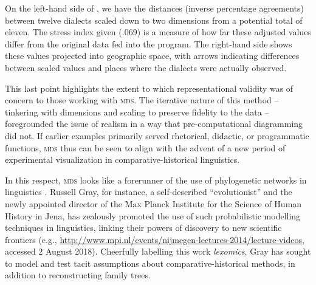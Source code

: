 \documentclass[output=paper]{langscibook}
\begin{document}
On the left-hand side of , we have the distances (inverse percentage agreements) between twelve dialects scaled down to two dimensions from a potential total of eleven. The stress index given (.069) is a measure of how far these adjusted values differ from the original data fed into the program. The right-hand side shows these values projected into geographic space, with arrows indicating differences between scaled values and places where the dialects were actually observed.

This last point highlights the extent to which representational validity was of concern to those working with \textsc{mds}. The iterative nature of this method -- tinkering with dimensions and scaling to preserve fidelity to the data -- foregrounded the issue of realism in a way that pre-computational diagramming did not. If earlier examples primarily served rhetorical, didactic, or programmatic functions, \textsc{mds} thus can be seen to align with the advent of a new period of experimental visualization in comparative-historical linguistics.

In this respect, \textsc{mds} looks like a forerunner of the use of phylogenetic networks in linguistics \citep{Stevens2013}. Russell Gray, for instance, a self-described ``evolutionist'' and the newly appointed director of the Max Planck Institute for the Science of Human History in Jena, has zealously promoted the use of such probabilistic modelling techniques in linguistics, linking their powers of discovery to new scientific frontiers (e.g., \url{http://www.mpi.nl/events/nijmegen-lectures-2014/lecture-videos}, accessed 2 August 2018). Cheerfully labelling this work \emph{lexomics}, Gray has sought to model and test tacit assumptions about comparative-his\-tor\-i\-cal methods, in addition to reconstructing family trees.
\end{document}
